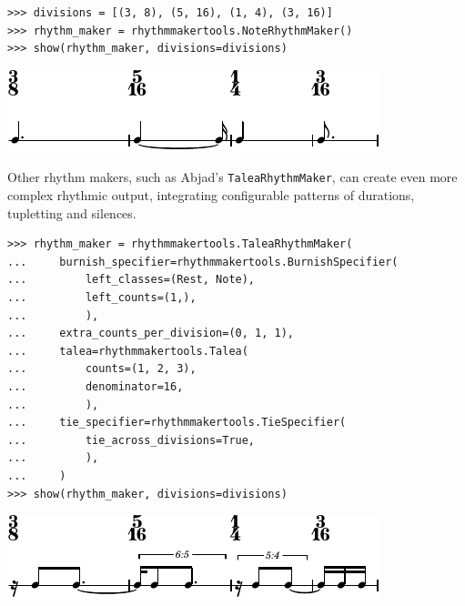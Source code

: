 \documentclass{article}
\begin{document}
\begin{lstlisting}
>>> divisions = [(3, 8), (5, 16), (1, 4), (3, 16)]
>>> rhythm_maker = rhythmmakertools.NoteRhythmMaker()
>>> show(rhythm_maker, divisions=divisions)
\end{lstlisting}
\includegraphics{assets/lilypond-af2aa88dc88360a6a0cf5c3f8da17b85.pdf}

\noindent Other rhythm makers, such as Abjad's \texttt{TaleaRhythmMaker}, can
create even more complex rhythmic output, integrating configurable patterns of
durations, tupletting and silences.

\begin{lstlisting}
>>> rhythm_maker = rhythmmakertools.TaleaRhythmMaker(
...     burnish_specifier=rhythmmakertools.BurnishSpecifier(
...         left_classes=(Rest, Note),
...         left_counts=(1,),
...         ),
...     extra_counts_per_division=(0, 1, 1),
...     talea=rhythmmakertools.Talea(
...         counts=(1, 2, 3),
...         denominator=16,
...         ),
...     tie_specifier=rhythmmakertools.TieSpecifier(
...         tie_across_divisions=True,
...         ),
...     )
>>> show(rhythm_maker, divisions=divisions)
\end{lstlisting}
\includegraphics{assets/lilypond-cf8687c5463d3d6aec12827476c8fc4e.pdf}
\end{document}
